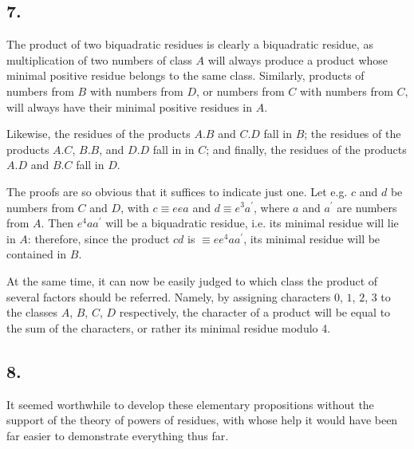 \documentclass[twoside,12pt]{memoir}
\begin{document}
\subsection*{7.}

The product of two biquadratic residues is clearly a biquadratic residue, as multiplication of two numbers of class \(A\) will always produce a product whose minimal positive residue belongs to the same class. Similarly, products of numbers from \(B\) with numbers from \(D\), or numbers from \(C\) with numbers from \(C\), will always have their minimal positive residues in \(A\).

Likewise, the residues of the products \(A . B\) and \(C . D\) fall in \(B\); the residues of the products \(A . C\), \(B . B\), and \(D . D\) fall in in \(C\); and finally, the residues of the products \(A . D\) and \(B . C\) fall in \(D\).

The proofs are so obvious that it suffices to indicate just one. Let e{.}g{.} \(c\) and \(d\) be numbers from \(C\) and \(D\), with \(c \equiv e ea\) and \(d \equiv e^{3} a^{\prime}\), where \(a\) and \(a^{\prime}\) are numbers from \(A\). Then \(e^{4} a a^{\prime}\) will be a biquadratic residue, i{.}e{.} its minimal residue will lie in \(A\): therefore, since the product \(c d\) is \(\equiv e e^{4} a a^{\prime}\), its minimal residue will be contained in \(B\).

At the same time, it can now be easily judged to which class the product of several factors should be referred. Namely, by assigning characters \(0\), \(1\), \(2\), \(3\) to the classes \(A\), \(B\), \(C\), \(D\) respectively, the character of a product will be equal to the sum of the characters, or rather its minimal residue modulo 4.
%

\subsection*{8.}

It seemed worthwhile to develop these elementary propositions without the support of the theory of powers of residues, with whose help it would have been far easier to demonstrate everything thus far.
\end{document}
